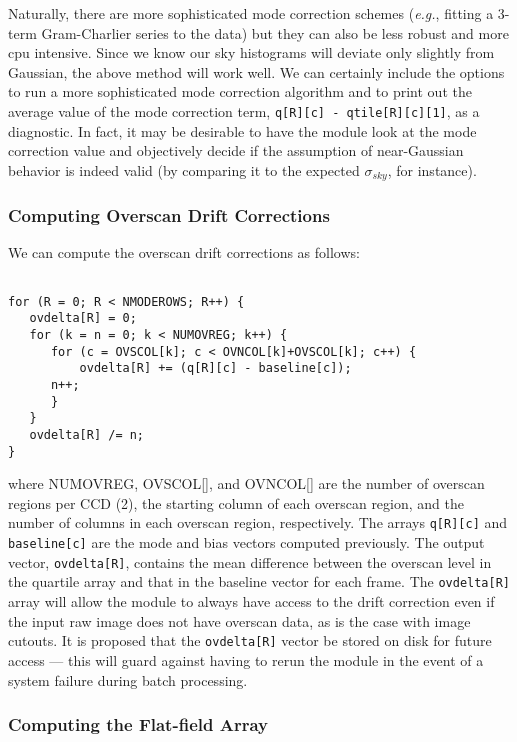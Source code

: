 Naturally, there are more sophisticated mode correction schemes
({\it e.g.}, fitting a 3-term Gram-Charlier series to the data)
but they can also be less robust and more cpu intensive.
Since we know our sky histograms will deviate only slightly
from Gaussian, the above method will work well. We
can certainly include the options to run a more sophisticated
mode correction algorithm and to print out the average
value of the mode correction term,
{\tt q[R][c] - qtile[R][c][1]}, as a diagnostic.
In fact, it may be desirable to have the \icfrm module look
at the mode correction value and objectively decide if 
the assumption of near-Gaussian behavior is indeed valid
(by comparing it to the expected $\sigma_{sky}$, for instance).

\subsubsection{Computing Overscan Drift Corrections}

We can compute the overscan drift corrections as follows:

\begin{verbatim}

for (R = 0; R < NMODEROWS; R++) {
   ovdelta[R] = 0;
   for (k = n = 0; k < NUMOVREG; k++) {
      for (c = OVSCOL[k]; c < OVNCOL[k]+OVSCOL[k]; c++) {
          ovdelta[R] += (q[R][c] - baseline[c]);
	  n++;
      }
   }
   ovdelta[R] /= n;
}

\end{verbatim}

\noindent where  NUMOVREG, OVSCOL[], and OVNCOL[] are the
number of overscan regions per CCD (2), the starting column
of each overscan region, and the number of columns in each
overscan region, respectively. The arrays
{\tt q[R][c]} and {\tt baseline[c]} are the 
mode and bias vectors computed previously. The output vector,
{\tt ovdelta[R]}, contains the mean difference between the
overscan level in the quartile array and that in the baseline
vector for each frame. The {\tt ovdelta[R]} array will allow
the \cfrm module to always have access to the
drift correction even if the input raw image does not have
overscan data, as is the case with image cutouts.
It is proposed that the {\tt ovdelta[R]} vector be stored on
disk for future access --- this will guard against having to rerun
the \icfrm module in the event of a system failure during
\cfrm batch processing.

\subsubsection{Computing the Flat-field Array}

